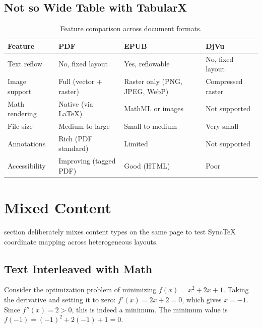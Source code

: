 \documentclass[11pt]{article}
\begin{document}
\subsection{Not so Wide Table with TabularX}

\begin{table}[h!]
\centering
\caption{Feature comparison across document formats.}
\label{tab:formats}
\begin{tabularx}{\textwidth}{@{} l X X X @{}}
\toprule
Feature & PDF & EPUB & DjVu \\
\midrule
Text reflow & No, fixed layout & Yes, reflowable & No, fixed layout \\
Image support & Full (vector + raster) & Raster only (PNG, JPEG, WebP) & Compressed raster \\
Math rendering & Native (via LaTeX) & MathML or images & Not supported \\
File size & Medium to large & Small to medium & Very small \\
Annotations & Rich (PDF standard) & Limited & Not supported \\
Accessibility & Improving (tagged PDF) & Good (HTML) & Poor \\
\bottomrule
\end{tabularx}
\end{table}

\lipsum[11-12]

\newpage

\section{Mixed Content}
\label{sec:mixed}

section deliberately mixes content types on the same page to test SyncTeX
coordinate mapping across heterogeneous layouts.

\subsection{Text Interleaved with Math}

Consider the optimization problem of minimizing $f(x) = x^2 + 2x + 1$. Taking
the derivative and setting it to zero: $f'(x) = 2x + 2 = 0$, which gives
$x = -1$. Since $f''(x) = 2 > 0$, this is indeed a minimum. The minimum value
is $f(-1) = (-1)^2 + 2(-1) + 1 = 0$.
\end{document}
